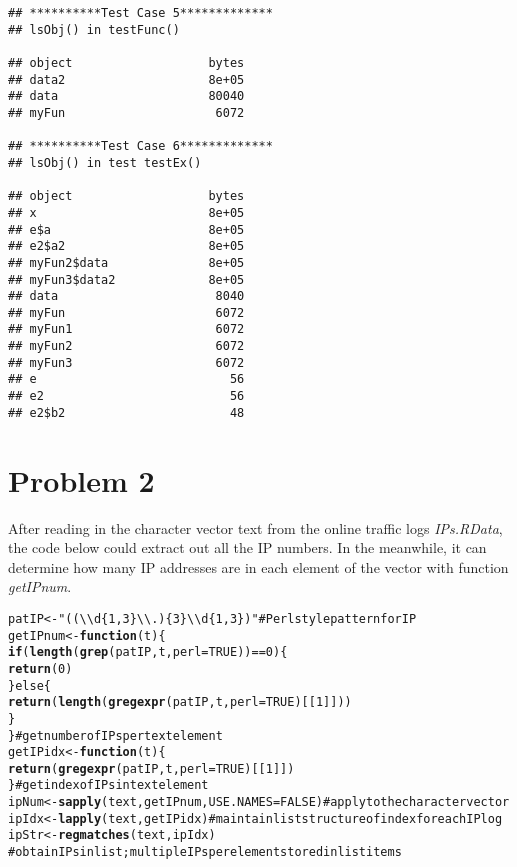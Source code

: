\documentclass{article}\usepackage{graphicx, color}
\makeatletter
\newcommand{\hlfunctioncall}[1]{\textcolor[rgb]{0.501960784313725,0,0.329411764705882}{\textbf{#1}}}%
\newcommand{\hlstring}[1]{\textcolor[rgb]{0.6,0.6,1}{#1}}%
\newcommand{\hlcomment}[1]{\textcolor[rgb]{0.180392156862745,0.6,0.341176470588235}{#1}}%
\newenvironment{kframe}{%
 \def\at@end@of@kframe{}%
 \ifinner\ifhmode%
  \def\at@end@of@kframe{\end{minipage}}%
  \begin{minipage}{\columnwidth}%
 \fi\fi%
 \def\FrameCommand##1{\hskip\@totalleftmargin \hskip-\fboxsep
 \colorbox{shadecolor}{##1}\hskip-\fboxsep
     \hskip-\linewidth \hskip-\@totalleftmargin \hskip\columnwidth}%
 \MakeFramed {\advance\hsize-\width
   \@totalleftmargin\z@ \linewidth\hsize
   \@setminipage}}%
 {\par\unskip\endMakeFramed%
 \at@end@of@kframe}
\newenvironment{knitrout}{}{} %
\makeatother
\begin{document}
\begin{knitrout}
\color{fgcolor}\begin{kframe}
\begin{verbatim}
## **********Test Case 5*************
## lsObj() in testFunc()

## object                   bytes
## data2                    8e+05
## data                     80040
## myFun                     6072

## **********Test Case 6*************
## lsObj() in test testEx()

## object                   bytes
## x                        8e+05
## e$a                      8e+05
## e2$a2                    8e+05
## myFun2$data              8e+05
## myFun3$data2             8e+05
## data                      8040
## myFun                     6072
## myFun1                    6072
## myFun2                    6072
## myFun3                    6072
## e                           56
## e2                          56
## e2$b2                       48
\end{verbatim}
\end{kframe}
\end{knitrout}



\newpage
\section*{Problem 2}

After reading in the character vector text from the online traffic logs \textit{IPs.RData}, the 
code below could extract out all the IP numbers. In the meanwhile, it can determine how many IP 
addresses are in each element of the vector with function \textit{getIPnum}.

\begin{knitrout}
\color{fgcolor}\begin{kframe}
\begin{alltt}
patIP <- \hlstring{"((\textbackslash{}\textbackslash{}d\{1,3\}\textbackslash{}\textbackslash{}.)\{3\}\textbackslash{}\textbackslash{}d\{1,3\})"}  #Perl style pattern for IP
getIPnum <- \hlfunctioncall{function}(t) \{
    \hlfunctioncall{if} (\hlfunctioncall{length}(\hlfunctioncall{grep}(patIP, t, perl = TRUE)) == 0) \{
        \hlfunctioncall{return}(0)
    \} else \{
        \hlfunctioncall{return}(\hlfunctioncall{length}(\hlfunctioncall{gregexpr}(patIP, t, perl = TRUE)[[1]]))
    \}
\}  \hlcomment{# get number of IPs per text element}
getIPidx <- \hlfunctioncall{function}(t) \{
    \hlfunctioncall{return}(\hlfunctioncall{gregexpr}(patIP, t, perl = TRUE)[[1]])
\}  \hlcomment{# get index of IPs in text element}
ipNum <- \hlfunctioncall{sapply}(text, getIPnum, USE.NAMES = FALSE)  \hlcomment{# apply to the character vector}
ipIdx <- \hlfunctioncall{lapply}(text, getIPidx)  \hlcomment{# maintain list structure of index for each IP log}
ipStr <- \hlfunctioncall{regmatches}(text, ipIdx)
\hlcomment{# obtain IPs in list; multiple IPs per element stored in list items}
\end{alltt}
\end{kframe}
\end{knitrout}
\end{document}
